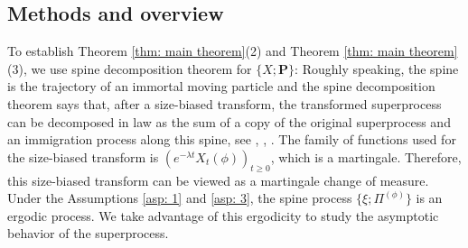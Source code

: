 \documentclass[12pt, a4paper]{amsart}
\theoremstyle{definition}
\numberwithin{equation}{section}
\begin{document}
\subsection{Methods and overview}
	
	To establish Theorem \ref{thm: main theorem}(2) and Theorem \ref{thm: main theorem}(3), we use spine decomposition theorem for  $\{X; \mathbf P\}$:
	Roughly speaking, the spine is the trajectory of an immortal moving particle and the spine decomposition theorem says that, after a size-biased transform, the transformed superprocess can be decomposed in law as the sum of a copy of the original superprocess and an immigration process along this spine, see \cite{EckhoffKyprianouWinkel2015Spines}, \cite{EnglanderKyprianou2004Local}, \cite{LiuRenSong2009Llog}.
	The family of functions used for the size-biased transform is $(e^{-\lambda t} X_t(\phi))_{t\geq 0}$, which is a martingale.
	Therefore, this size-biased transform can be viewed as a martingale change of measure.
	Under the Assumptions \ref{asp: 1} and \ref{asp: 3}, 
	the spine process $\{\xi; \Pi^{(\phi)}\}$ is an ergodic process.
	We take advantage of this ergodicity to study the asymptotic behavior of the superprocess.
	
\end{document}
